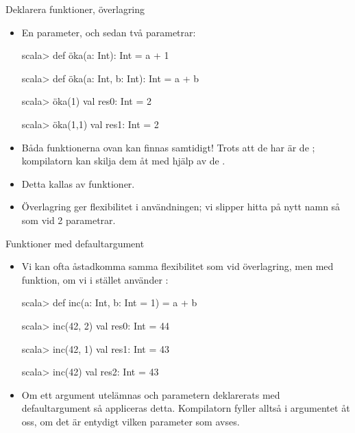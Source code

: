 \begin{Slide}{Deklarera funktioner, överlagring}
\begin{itemize}
\item En parameter, och sedan två parametrar:
\begin{REPL}
scala> def öka(a: Int): Int = a + 1

scala> def öka(a: Int, b: Int): Int = a + b

scala> öka(1)
val res0: Int = 2

scala> öka(1,1)
val res1: Int = 2

\end{REPL}
\item Båda funktionerna ovan kan finnas samtidigt! Trots att de har  är de ; kompilatorn kan skilja dem åt med hjälp av de .

\item Detta kallas   av funktioner.
\item Överlagring ger flexibilitet i användningen; vi slipper hitta på nytt namn så som  vid 2 parametrar.
\end{itemize}
\end{Slide}



\begin{Slide}{Funktioner med defaultargument}\SlideFontSmall

\begin{itemize}
\item Vi kan ofta åstadkomma samma flexibilitet som vid överlagring, men med  funktion, om vi i stället använder :
\begin{REPLnonum}
scala> def inc(a: Int, b: Int = 1) = a + b

scala> inc(42, 2)
val res0: Int = 44

scala> inc(42, 1)
val res1: Int = 43

scala> inc(42)
val res2: Int = 43

\end{REPLnonum}
\item Om ett argument utelämnas och parametern deklarerats med defaultargument så appliceras detta. Kompilatorn fyller alltså i argumentet åt oss, om det är entydigt vilken parameter som avses.
\end{itemize}
\end{Slide}


